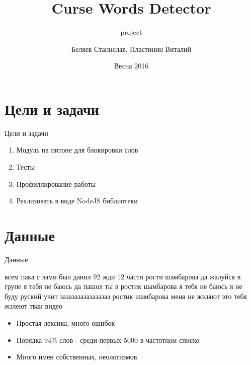 \documentclass{beamer}
\title{Curse Words Detector}
\subtitle{project}
\author{Беляев Станислав, Пластинин Виталий}
\institute{СПб АУ РАН}
\date{Весна 2016}
\begin{document}
\frame{\titlepage}

\section{Цели и задачи}
\begin{frame}[<+->]{Цели и задачи}
    \begin{enumerate}
        \item Модуль на питоне для блокировки слов
        \item Тесты
        \item Профиллирование работы
        \item Реализовать в виде NodeJS библиотеки
    \end{enumerate}
\end{frame}

\section{Данные}
\begin{frame}{Данные}
    \begin{tcolorbox}[colback=blue!5,colframe=blue!40!black,title=Реальный пример текста]
        всем пака с вами был данил 92 жди 12 части
        рости шамбарова да жалуйся в групе я тебя не баюсь да пашол ты в ростик шамбарова
        я тебя не баюсь я не буду руский учит зазазазазазазазаз
        ростик шамбарова меня не жэляют это тебя жэлеют тваи видео
    \end{tcolorbox}
    \begin{itemize}
        \item Простая лексика, много ошибок
        \item Порядка $94\%$ слов - среди первых $5000$ в частотном списке
        \item Много имен собственных, неологизмов
    \end{itemize}
\end{frame}
\end{document}

